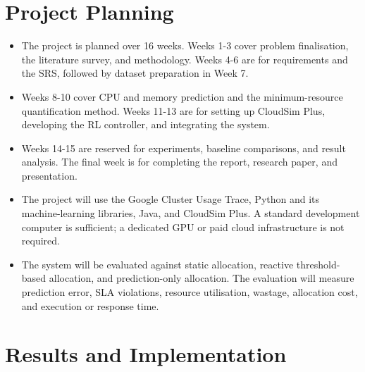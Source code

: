 \documentclass[12pt,a4paper]{report}
\begin{document}
\chapter{Project Planning}
\begin{itemize}
    \item The project is planned over 16 weeks. Weeks 1-3 cover problem finalisation, the literature survey, and methodology. Weeks 4-6 are for requirements and the SRS, followed by dataset preparation in Week 7.
    \item Weeks 8-10 cover CPU and memory prediction and the minimum-resource quantification method. Weeks 11-13 are for setting up CloudSim Plus, developing the RL controller, and integrating the system.
    \item Weeks 14-15 are reserved for experiments, baseline comparisons, and result analysis. The final week is for completing the report, research paper, and presentation.
    \item The project will use the Google Cluster Usage Trace, Python and its machine-learning libraries, Java, and CloudSim Plus. A standard development computer is sufficient; a dedicated GPU or paid cloud infrastructure is not required.
    \item The system will be evaluated against static allocation, reactive threshold-based allocation, and prediction-only allocation. The evaluation will measure prediction error, SLA violations, resource utilisation, wastage, allocation cost, and execution or response time.
\end{itemize}
\lipsum[91-95]

\chapter{Results and Implementation}
\end{document}

